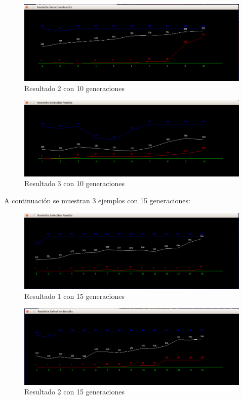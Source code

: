\documentclass[11pt,letterpaper]{article}
\begin{document}
\begin{figure}[H]
	\centering
	\includegraphics[scale = 0.4]{images/10gen2}
	\caption{Resultado 2 con 10 generaciones}
\end{figure}

\begin{figure}[H]
	\centering
	\includegraphics[scale = 0.4]{images/10gen3}
	\caption{Resultado 3 con 10 generaciones}
\end{figure}

A continuación se muestran 3 ejemplos con 15 generaciones:
\begin{figure}[H]
	\centering
	\includegraphics[scale = 0.4]{images/15gen1}
	\caption{Resultado 1 con 15 generaciones}
\end{figure}

\begin{figure}[H]
	\centering
	\includegraphics[scale = 0.4]{images/15gen2}
	\caption{Resultado 2 con 15 generaciones}
\end{figure}
\end{document}
